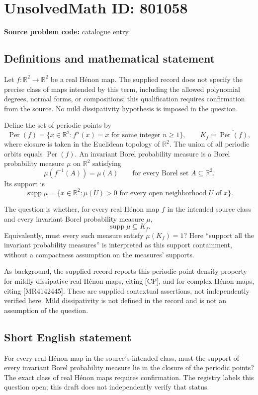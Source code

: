 \documentclass[11pt]{article}
\newcommand{\R}{\mathbb{R}}
\begin{document}
\section*{UnsolvedMath ID: 801058}
\textbf{Source problem code:} catalogue entry
\subsection{Definitions and mathematical statement}
Let \(f:\R^2\to\R^2\) be a real H\'enon map. The supplied record does not specify the precise class of maps intended by this term, including the allowed polynomial degrees, normal forms, or compositions; this qualification requires confirmation from the source. No mild dissipativity hypothesis is imposed in the question.

Define the set of periodic points by
\[
\operatorname{Per}(f)=\{x\in\R^2: f^n(x)=x\text{ for some integer }n\geq 1\},
\qquad K_f=\overline{\operatorname{Per}(f)},
\]
where closure is taken in the Euclidean topology of \(\R^2\). The union of all periodic orbits equals \(\operatorname{Per}(f)\). An invariant Borel probability measure is a Borel probability measure \(\mu\) on \(\R^2\) satisfying
\[
\mu(f^{-1}(A))=\mu(A)\qquad\text{for every Borel set }A\subseteq\R^2.
\]
Its support is
\[
\operatorname{supp}\mu=\{x\in\R^2:\mu(U)>0\text{ for every open neighborhood }U\text{ of }x\}.
\]

The question is whether, for every real H\'enon map \(f\) in the intended source class and every invariant Borel probability measure \(\mu\),
\[
\operatorname{supp}\mu\subseteq K_f.
\]
Equivalently, must every such measure satisfy \(\mu(K_f)=1\)? Here ``support all the invariant probability measures'' is interpreted as this support containment, without a compactness assumption on the measures' supports.

As background, the supplied record reports this periodic-point density property for mildly dissipative real H\'enon maps, citing [CP], and for complex H\'enon maps, citing [MR4142445]. These are supplied contextual assertions, not independently verified here. Mild dissipativity is not defined in the record and is not an assumption of the question.
\subsection{Short English statement}
For every real H\'enon map in the source's intended class, must the support of every invariant Borel probability measure lie in the closure of the periodic points? The exact class of real H\'enon maps requires confirmation. The registry labels this question open; this draft does not independently verify that status.
\end{document}
